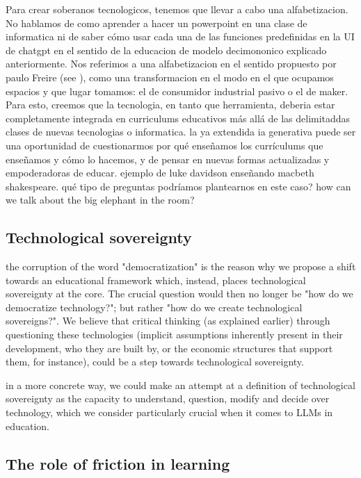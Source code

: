 \documentclass{article}
\begin{document}
Para crear soberanos tecnologicos, tenemos que llevar a cabo una alfabetizacion. No hablamos de como aprender a hacer un powerpoint en una clase de informatica ni de saber cómo usar cada una de las funciones predefinidas en la UI de chatgpt en el sentido de la educacion de modelo decimononico explicado anteriormente. Nos referimos a una alfabetizacion en el sentido propuesto por paulo Freire (see \cite{freire1998pedagogy}), como una transformacion en el modo en el que ocupamos espacios y que lugar tomamos: el de consumidor industrial pasivo o el de maker. Para esto, creemos que la tecnologia, en tanto que herramienta, deberia estar completamente integrada en curriculums educativos más allá de las delimitaddas clases de nuevas tecnologias o informatica. la ya extendida ia generativa puede ser una oportunidad de cuestionarmos por qué enseñamos los currículums que enseñamos y cómo lo hacemos, y de pensar en nuevas formas actualizadas y empoderadoras de educar. ejemplo de luke davidson enseñando macbeth shakespeare. qué tipo de preguntas podríamos plantearnos en este caso? how can we talk about the big elephant in the room?


\subsection{Technological sovereignty}

the corruption of the word "democratization" is the reason why we propose a shift towards an educational framework which, instead, places technological sovereignty at the core. The crucial question would then no longer be "how do we democratize technology?"; but rather "how do we create technological sovereigns?". We believe that critical thinking (as explained earlier) through questioning these technologies (implicit assumptions inherently present in their development, who they are built by, or the economic structures that support them, for instance), could be a step towards technological sovereignty. 

in a more concrete way, we could make an attempt at a definition of technological sovereignty as the capacity to understand, question, modify and decide over technology, which we consider particularly crucial when it comes to LLMs in education. 


\subsection{The role of friction in learning}
\end{document}
